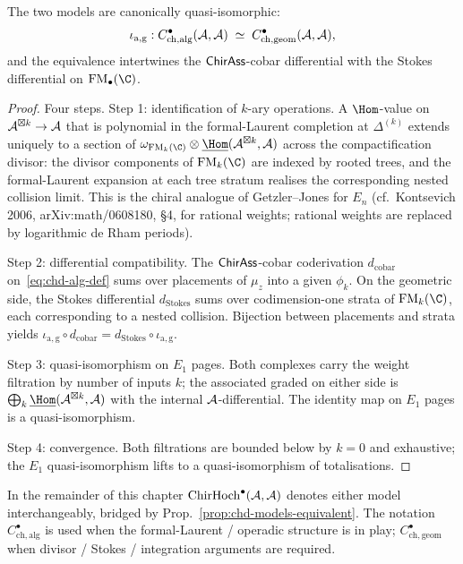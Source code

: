 \begin{proposition}%
\label{prop:chd-models-equivalent}%
%
The two models are canonically quasi-isomorphic:
\[
 \iota_{\mathrm{a,g}}:
 C^\bullet_{\mathrm{ch,alg}}(\mathcal{A}, \mathcal{A}) \;\simeq\;
 C^\bullet_{\mathrm{ch,geom}}(\mathcal{A}, \mathcal{A}),
\]
and the equivalence intertwines the $\mathsf{ChirAss}$-cobar differential with
the Stokes differential on $\FM_\bullet(\C)$.
\end{proposition}

\begin{proof}
Four steps. Step 1: identification of $k$-ary operations. A
$\Hom$-value on $\mathcal{A}^{\boxtimes k} \to \mathcal{A}$ that is polynomial in the
formal-Laurent completion at $\Delta^{(k)}$ extends uniquely to a
section of $\omega_{\FM_k(\C)}\otimes \underline{\Hom}(\cA^{\boxtimes k}, \cA)$
across the compactification divisor: the divisor components of
$\FM_k(\C)$ are indexed by rooted trees, and the formal-Laurent expansion at
each tree stratum realises the corresponding nested collision limit.
This is the chiral analogue of Getzler--Jones for $E_n$
(cf.~Kontsevich 2006, arXiv:math/0608180, \S4, for rational
weights; rational weights are replaced by logarithmic de Rham
periods).

Step 2: differential compatibility. The $\mathsf{ChirAss}$-cobar coderivation
$d_{\mathrm{cobar}}$ on~\eqref{eq:chd-alg-def} sums over placements of
$\mu_z$ into a given $\phi_k$. On the geometric side, the Stokes
differential $d_{\mathrm{Stokes}}$ sums over codimension-one strata of
$\FM_k(\C)$, each corresponding to a nested collision. Bijection
between placements and strata yields
$\iota_{\mathrm{a,g}}\circ d_{\mathrm{cobar}} = d_{\mathrm{Stokes}}\circ \iota_{\mathrm{a,g}}$.

Step 3: quasi-isomorphism on $E_1$ pages. Both complexes carry the
weight filtration by number of inputs $k$; the associated graded on
either side is $\bigoplus_k \underline{\Hom}(\cA^{\boxtimes k}, \cA)$
with the internal $\mathcal{A}$-differential. The identity map on $E_1$ pages
is a quasi-isomorphism.

Step 4: convergence. Both filtrations are bounded below by $k = 0$
and exhaustive; the $E_1$ quasi-isomorphism lifts to a quasi-isomorphism
of totalisations.
\end{proof}

\begin{convention}[Dealiasing]%
\label{conv:chd-dealias}%
In the remainder of this chapter $\mathrm{ChirHoch}^\bullet(\mathcal{A}, \mathcal{A})$
denotes either model interchangeably, bridged by
Prop.~\ref{prop:chd-models-equivalent}. The notation
$C^\bullet_{\mathrm{ch,alg}}$ is used when the formal-Laurent /
operadic structure is in play; $C^\bullet_{\mathrm{ch,geom}}$ when
divisor / Stokes / integration arguments are required.
\end{convention}

